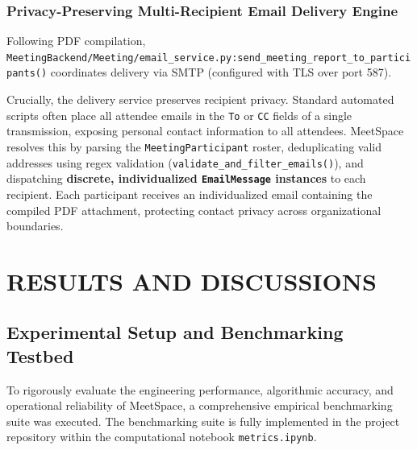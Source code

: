 \documentclass[12pt,oneside,letterpaper]{report}
\numberwithin{equation}{chapter} %
\begin{document}
\subsection{Privacy-Preserving Multi-Recipient Email Delivery Engine}
Following PDF compilation, \texttt{MeetingBackend/Meeting/email\_service.py:send\_meeting\_report\_to\_participants()} coordinates delivery via SMTP (configured with TLS over port 587). 

Crucially, the delivery service preserves recipient privacy. Standard automated scripts often place all attendee emails in the \texttt{To} or \texttt{CC} fields of a single transmission, exposing personal contact information to all attendees. MeetSpace resolves this by parsing the \texttt{MeetingParticipant} roster, deduplicating valid addresses using regex validation (\texttt{validate\_and\_filter\_emails()}), and dispatching \textbf{discrete, individualized \texttt{EmailMessage} instances} to each recipient. Each participant receives an individualized email containing the compiled PDF attachment, protecting contact privacy across organizational boundaries.

\chapter{RESULTS AND DISCUSSIONS}

\section{Experimental Setup and Benchmarking Testbed}
To rigorously evaluate the engineering performance, algorithmic accuracy, and operational reliability of MeetSpace, a comprehensive empirical benchmarking suite was executed. The benchmarking suite is fully implemented in the project repository within the computational notebook \texttt{metrics.ipynb}.
\end{document}
